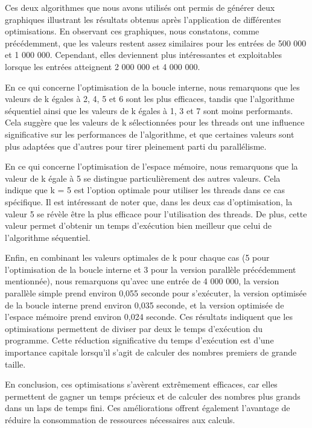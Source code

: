 \documentclass[
]{article}
\begin{document}
Ces deux algorithmes que nous avons utilisés ont permis de générer deux
graphiques illustrant les résultats obtenus après l'application de
différentes optimisations. En observant ces graphiques, nous constatons,
comme précédemment, que les valeurs restent assez similaires pour les
entrées de 500 000 et 1 000 000. Cependant, elles deviennent plus
intéressantes et exploitables lorsque les entrées atteignent 2 000 000
et 4 000 000.

En ce qui concerne l'optimisation de la boucle interne, nous remarquons
que les valeurs de k égales à 2, 4, 5 et 6 sont les plus efficaces,
tandis que l'algorithme séquentiel ainsi que les valeurs de k égales à
1, 3 et 7 sont moins performants. Cela suggère que les valeurs de k
sélectionnées pour les threads ont une influence significative sur les
performances de l'algorithme, et que certaines valeurs sont plus
adaptées que d'autres pour tirer pleinement parti du parallélisme.

En ce qui concerne l'optimisation de l'espace mémoire, nous remarquons
que la valeur de k égale à 5 se distingue particulièrement des autres
valeurs. Cela indique que k = 5 est l'option optimale pour utiliser les
threads dans ce cas spécifique. Il est intéressant de noter que, dans
les deux cas d'optimisation, la valeur 5 se révèle être la plus efficace
pour l'utilisation des threads. De plus, cette valeur permet d'obtenir
un temps d'exécution bien meilleur que celui de l'algorithme séquentiel.

Enfin, en combinant les valeurs optimales de k pour chaque cas (5 pour
l'optimisation de la boucle interne et 3 pour la version parallèle
précédemment mentionnée), nous remarquons qu'avec une entrée de 4 000
000, la version parallèle simple prend environ 0,055 seconde pour
s'exécuter, la version optimisée de la boucle interne prend environ
0,035 seconde, et la version optimisée de l'espace mémoire prend environ
0,024 seconde. Ces résultats indiquent que les optimisations permettent
de diviser par deux le temps d'exécution du programme. Cette réduction
significative du temps d'exécution est d'une importance capitale
lorsqu'il s'agit de calculer des nombres premiers de grande taille.

En conclusion, ces optimisations s'avèrent extrêmement efficaces, car
elles permettent de gagner un temps précieux et de calculer des nombres
plus grands dans un laps de temps fini. Ces améliorations offrent
également l'avantage de réduire la consommation de ressources
nécessaires aux calculs.
\end{document}
